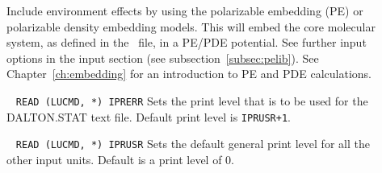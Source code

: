 \begin{description}
%



\item[] Include environment effects by using the polarizable embedding (PE)
or polarizable density embedding models.
This will embed the core molecular system, as defined in the \molinp\ file, in a
PE/PDE potential. See further input options
in the  input section (see subsection~\ref{subsec:pelib}). See
Chapter~\ref{ch:embedding} for an introduction to PE and PDE calculations.

\item[]\verb| |\newline
\verb|READ (LUCMD, *) IPRERR|
 
Sets the print level that is to be used for the DALTON.STAT text
file. Default print level is \verb|IPRUSR+1|.

\item[]\verb| |\newline
\verb|READ (LUCMD, *) IPRUSR|
Sets the default general print level for all the other input units.
Default is a print level of 0.


\end{description}
